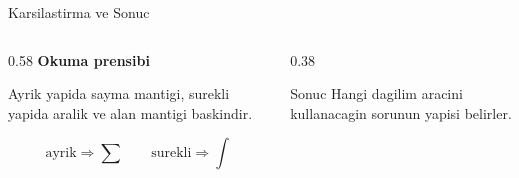 \begin{frame}[t]{Karsilastirma ve Sonuc}
\small
\begin{columns}[T,onlytextwidth]
    \begin{column}{0.58\textwidth}
        \textbf{Okuma prensibi}

        \vspace{0.2cm}
        Ayrik yapida sayma mantigi, surekli yapida aralik ve alan mantigi baskindir.

        \[
            \text{ayrik} \Rightarrow \sum
            \qquad
            \text{surekli} \Rightarrow \int
        \]
    \end{column}
    \begin{column}{0.38\textwidth}
        \begin{resultblock}{Sonuc}
            Hangi dagilim aracini kullanacagin sorunun yapisi belirler.
        \end{resultblock}
    \end{column}
\end{columns}
\end{frame}
